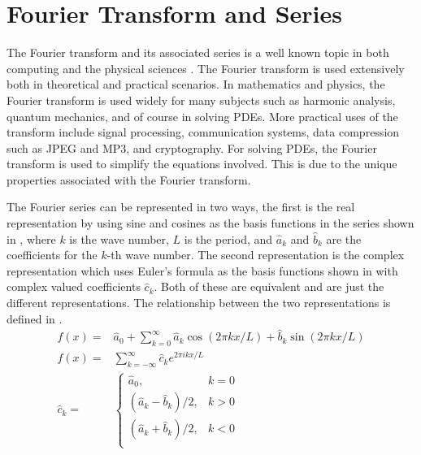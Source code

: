 \section{Fourier Transform and Series}\label{sec:fourier_discussion}
\noindent The Fourier transform and its associated series is a well known topic in both computing and the physical sciences \autocite{smithMathematicsDiscreteFourier2007}. The Fourier transform is used extensively both in theoretical and practical scenarios. In mathematics and physics, the Fourier transform is used widely for many subjects such as harmonic analysis, quantum mechanics, and of course in solving PDEs. More practical uses of the transform include signal processing, communication systems, data compression such as JPEG and MP3, and cryptography. For solving PDEs, the Fourier transform is used to simplify the equations involved. This is due to the unique properties associated with the Fourier transform.

The Fourier series can be represented in two ways, the first is the real representation by using sine and cosines as the basis functions in the series shown in , where \(k\) is the wave number, \(L\) is the period, and \(\hat{a}_{k}\) and \(\hat{b}_{k}\) are the coefficients for the \(k\)-th wave number. The second representation is the complex representation which uses Euler's formula as the basis functions shown in  with complex valued coefficients \(\hat{c}_{k}\). Both of these are equivalent and are just the different representations. The relationship between the two representations is defined in .
\begin{align}
  f(x)=       & \hat{a}_0 + \sum_{k=0}^{\infty} \hat{a}_k\cos(2\pi kx/L) + \hat{b}_k\sin(2\pi kx/L)\label{eq:fourier_series_sine_cosine} \\
  f(x)=       & \sum_{k=-\infty}^{\infty} \hat{c}_k e^{2\pi ikx/L}\label{eq:fourier_series_complex}                                      \\
  \hat{c}_k = & \begin{cases}
                  \hat{a}_0,               & k = 0 \\
                  (\hat{a}_k-\hat{b}_k)/2, & k > 0 \\
                  (\hat{a}_k+\hat{b}_k)/2, & k < 0 \\
                \end{cases}\label{eq:fourier_coefficient_equivalency}
\end{align}


